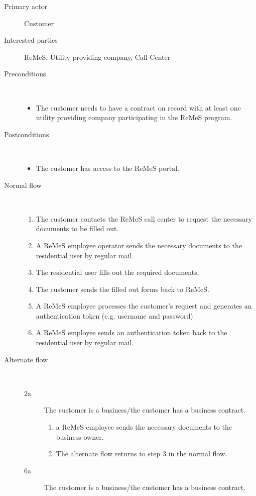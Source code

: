 \begin{description}
	\item[Primary actor] Customer
	\item[Interested parties] ReMeS, Utility providing company, Call Center 
	\item[Preconditions] \ 
	\begin{itemize}
		\item The customer needs to have a contract on record with at least one
		utility providing company participating in the ReMeS program.
	\end{itemize}
	\item[Postconditions] \ 
	\begin{itemize}
		\item The customer has access to the ReMeS portal.
	\end{itemize}
	\item[Normal flow] \ 
	\begin{enumerate}
		\item The customer contacts the ReMeS call center to request the necessary
		documents to be filled out.
		\item A ReMeS employee operator sends the necessary documents to the
		residential user by regular mail.
		\item The residential user fills out the required documents.
		\item The customer sends the filled out forms back to ReMeS.
		\item A ReMeS employee processes the customer's request and generates an
		authentication token (e.g. username and password)
		\item A ReMeS employee sends an authentication token back to the residential
		user by regular mail.
	\end{enumerate}
	\item[Alternate flow] \ 
	\begin{description}
		\item[2a] The customer is a business/the customer has a business contract.
		\begin{enumerate}
			\item a ReMeS employee sends the necessary documents to the business owner.
			\item The alternate flow returns to step 3 in the normal flow.
		\end{enumerate}
		\item[6a] The customer is a business/the customer has a business contract.

\end{description}
\end{description}
